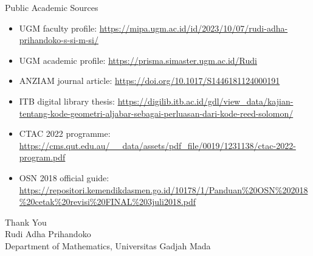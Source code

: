 \documentclass[aspectratio=169,11pt]{beamer}
\begin{document}
\begin{frame}{Public Academic Sources}
\scriptsize
\begin{itemize}
\item UGM faculty profile: \url{https://mipa.ugm.ac.id/id/2023/10/07/rudi-adha-prihandoko-s-si-m-si/}
\item UGM academic profile: \url{https://prisma.simaster.ugm.ac.id/Rudi}
\item ANZIAM journal article: \url{https://doi.org/10.1017/S1446181124000191}
\item ITB digital library thesis: \url{https://digilib.itb.ac.id/gdl/view_data/kajian-tentang-kode-geometri-aljabar-sebagai-perluasan-dari-kode-reed-solomon/}
\item CTAC 2022 programme: \url{https://cms.qut.edu.au/__data/assets/pdf_file/0019/1231138/ctac-2022-program.pdf}
\item OSN 2018 official guide: \url{https://repositori.kemendikdasmen.go.id/10178/1/Panduan\%20OSN\%202018\%20cetak\%20revisi\%20FINAL\%203juli2018.pdf}
\end{itemize}
\end{frame}

\begin{frame}[plain]
\centering
{\LARGE Thank You}\\[1.5em]
{\large Rudi Adha Prihandoko}\\[0.5em]
Department of Mathematics, Universitas Gadjah Mada
\end{frame}
\end{document}
